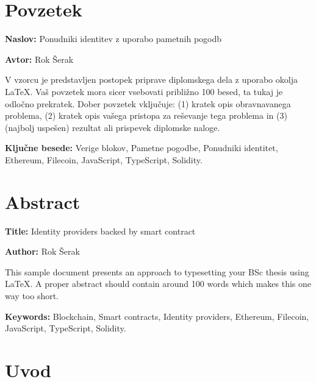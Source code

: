 \documentclass[a4paper,12pt,openright]{book}
\newcommand{\ttitle}{Ponudniki identitev z uporabo pametnih pogodb}
\newcommand{\ttitleEn}{Identity providers backed by smart contract}
\newcommand{\tauthor}{Rok Šerak}
\newcommand{\tkeywords}{Verige blokov, Pametne pogodbe, Ponudniki identitet, Ethereum, Filecoin, JavaScript, TypeScript, Solidity}
\newcommand{\tkeywordsEn}{Blockchain, Smart contracts, Identity providers, Ethereum, Filecoin, JavaScript, TypeScript, Solidity}
\newcommand{\clearemptydoublepage}{\newpage{\pagestyle{empty}\cleardoublepage}}
\begin{document}
\clearemptydoublepage

\chapter*{Povzetek}

\noindent\textbf{Naslov:} \ttitle
\bigskip

\noindent\textbf{Avtor:} \tauthor
\bigskip

\noindent V vzorcu je predstavljen postopek priprave diplomskega dela z uporabo okolja \LaTeX. Vaš povzetek mora sicer vsebovati približno 100 besed, ta tukaj je odločno prekratek.
Dober povzetek vključuje: (1) kratek opis obravnavanega problema, (2) kratek opis vašega pristopa za reševanje tega problema in (3) (najbolj uspešen) rezultat ali prispevek diplomske naloge.

\bigskip

\noindent\textbf{Ključne besede:} \tkeywords.
\clearemptydoublepage

\chapter*{Abstract}

\noindent\textbf{Title:} \ttitleEn
\bigskip

\noindent\textbf{Author:} \tauthor
\bigskip

\noindent This sample document presents an approach to typesetting your BSc thesis using \LaTeX. 
A proper abstract should contain around 100 words which makes this one way too short.
\bigskip

\noindent\textbf{Keywords:} \tkeywordsEn.
\clearemptydoublepage

\mainmatter
\setcounter{page}{1}
\pagestyle{fancy}

\chapter{Uvod}
\end{document}
